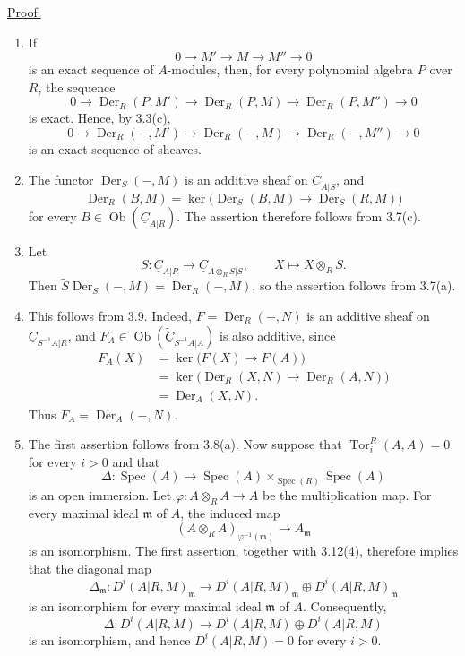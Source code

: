 \underline{Proof.}

\begin{enumerate}[label=(\arabic*)]
\item If
\[
 0\longrightarrow M'\longrightarrow M\longrightarrow M''
 \longrightarrow0
\]
is an exact sequence of $A$-modules, then, for every polynomial
algebra $P$ over $R$, the sequence
\[
 0\longrightarrow\operatorname{Der}_R(P,M')
 \longrightarrow\operatorname{Der}_R(P,M)
 \longrightarrow\operatorname{Der}_R(P,M'')
 \longrightarrow0
\]
is exact. Hence, by 3.3(c),
\[
 0\longrightarrow\operatorname{Der}_R(-,M')
 \longrightarrow\operatorname{Der}_R(-,M)
 \longrightarrow\operatorname{Der}_R(-,M'')
 \longrightarrow0
\]
is an exact sequence of sheaves.

\item The functor $\operatorname{Der}_S(-,M)$ is an additive sheaf
on $\underline C_{A|S}$, and
\[
 \operatorname{Der}_R(B,M)
 =\ker\bigl(\operatorname{Der}_S(B,M)
 \longrightarrow\operatorname{Der}_S(R,M)\bigr)
\]
for every $B\in\operatorname{Ob}(\underline C_{A|R})$.
The assertion therefore follows from 3.7(c).

\item Let
\[
 S:\underline C_{A|R}\longrightarrow
 \underline C_{A\otimes_RS|S},
 \qquad X\longmapsto X\otimes_RS.
\]
Then
$\widetilde S\operatorname{Der}_S(-,M)
=\operatorname{Der}_R(-,M)$, so the assertion follows from 3.7(a).


\item This follows from 3.9. Indeed,
$F=\operatorname{Der}_R(-,N)$ is an additive sheaf on
$\underline C_{S^{-1}A|R}$, and
$F_A\in\operatorname{Ob}
(\widetilde{\underline C}_{S^{-1}A|A})$ is also additive, since
\begin{align*}
 F_A(X)
 &=\ker\bigl(F(X)\longrightarrow F(A)\bigr)\\
 &=\ker\bigl(\operatorname{Der}_R(X,N)
   \longrightarrow\operatorname{Der}_R(A,N)\bigr)\\
 &=\operatorname{Der}_A(X,N).
\end{align*}
Thus $F_A=\operatorname{Der}_A(-,N)$.

\item The first assertion follows from 3.8(a). Now suppose that
$\operatorname{Tor}_i^R(A,A)=0$ for every $i>0$ and that
\[
 \Delta:\operatorname{Spec}(A)\longrightarrow
 \operatorname{Spec}(A)\times_{\operatorname{Spec}(R)}
 \operatorname{Spec}(A)
\]
is an open immersion. Let
$\varphi:A\otimes_RA\longrightarrow A$ be the multiplication map.
For every maximal ideal $\mathfrak m$ of $A$, the induced map
\[
 (A\otimes_RA)_{\varphi^{-1}(\mathfrak m)}
 \longrightarrow A_{\mathfrak m}
\]
is an isomorphism. The first assertion, together with 3.12(4),
therefore implies that the diagonal map
\[
 \Delta_{\mathfrak m}:D^i(A|R,M)_{\mathfrak m}
 \longrightarrow D^i(A|R,M)_{\mathfrak m}
 \oplus D^i(A|R,M)_{\mathfrak m}
\]
is an isomorphism for every maximal ideal $\mathfrak m$ of $A$.
Consequently,
\[
 \Delta:D^i(A|R,M)\longrightarrow
 D^i(A|R,M)\oplus D^i(A|R,M)
\]
is an isomorphism, and hence $D^i(A|R,M)=0$ for every $i>0$.


\end{enumerate}
